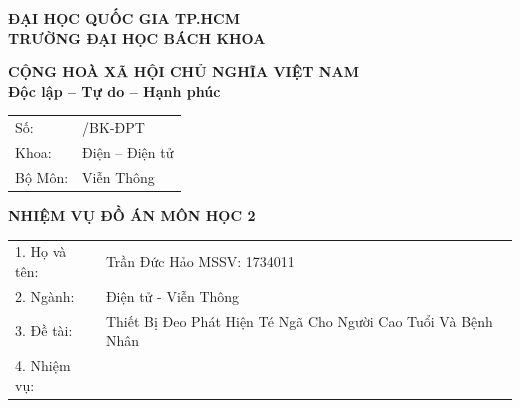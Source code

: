 \documentclass[a4paper,12pt]{report}
\begin{document}
\newpage

	\thispagestyle{empty}
	
	
	\noindent
	\begin{minipage}[t]{0.48\textwidth}
		\centering
		\textbf{ĐẠI HỌC QUỐC GIA TP.HCM} \\
		\textbf{TRƯỜNG ĐẠI HỌC BÁCH KHOA} \\
	\end{minipage}%
	\hfill
	\begin{minipage}[t]{0.48\textwidth}
		\centering
		\textbf{CỘNG HOÀ XÃ HỘI CHỦ NGHĨA VIỆT NAM} \\
		\textbf{Độc lập -- Tự do -- Hạnh phúc} \\
	\end{minipage}
	
	\vspace{0.5em}
	
	\noindent
	\begin{tabular}{ll}
		Số: & \underline{\hspace{2cm}}/BK-ĐPT \\
		Khoa: & Điện -- Điện tử \\
		Bộ Môn: & Viễn Thông \\
	\end{tabular}
	
	\vspace{0.5em}
	
	\begin{center}
		\textbf{\large NHIỆM VỤ ĐỒ ÁN MÔN HỌC 2}
	\end{center}
	
	\vspace{0.5em}
	
	\noindent
	\begin{tabular}{ll}
		1. Họ và tên: & Trần Đức Hảo \hspace{2cm} MSSV: 1734011 \\
		2. Ngành: & Điện tử - Viễn Thông \\
		3. Đề tài: & Thiết Bị Đeo Phát Hiện Té Ngã Cho Người Cao Tuổi Và Bệnh Nhân \\
		4. Nhiệm vụ: \\
		
		
	\end{tabular}
	
\end{document}
